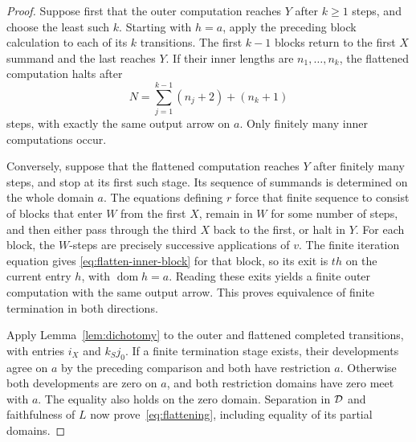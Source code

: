 \documentclass[11pt]{article}
\newcommand{\dom}{\operatorname{dom}}\newcommand{\ran}{\operatorname{ran}}
\begin{document}
\begin{proof}
Suppose first that the outer computation reaches $Y$ after $k\geq1$ steps,
and choose the least such $k$. Starting with $h=a$, apply the preceding
block calculation to each of its $k$ transitions. The first $k-1$
blocks return to the first $X$ summand and the last reaches $Y$.
If their inner lengths are $n_1,\ldots,n_k$, the flattened computation
halts after
\[
N=\sum_{j=1}^{k-1}(n_j+2)+(n_k+1)
\]
steps, with exactly the same output arrow on $a$. Only finitely many inner computations occur.

Conversely, suppose that the flattened computation reaches $Y$ after
finitely many steps, and stop at its first such stage. Its sequence of
summands is determined on the whole domain $a$. The equations defining
$r$ force that finite sequence to consist of blocks that enter $W$
from the first $X$, remain in $W$ for some number of steps, and then
either pass through the third $X$ back to the first, or halt in $Y$.
For each block, the $W$-steps are precisely successive applications of
$v$. The finite iteration equation gives
\eqref{eq:flatten-inner-block} for that block, so its exit is $th$ on
the current entry $h$, with $\dom h=a$. Reading these exits yields
a finite outer computation with the same output arrow. This proves
equivalence of finite termination in both directions.

Apply Lemma~\ref{lem:dichotomy} to the outer and flattened completed
transitions, with entries $i_X$ and $k_Sj_0$. If a finite termination
stage exists, their developments agree on $a$ by the preceding
comparison and both have restriction $a$. Otherwise both developments
are zero on $a$, and both restriction domains have zero meet with $a$.
The equality also holds on the zero domain. Separation in $\mathcal D$ and
faithfulness of $L$ now prove~\eqref{eq:flattening}, including equality
of its partial domains.
\end{proof}
\end{document}
